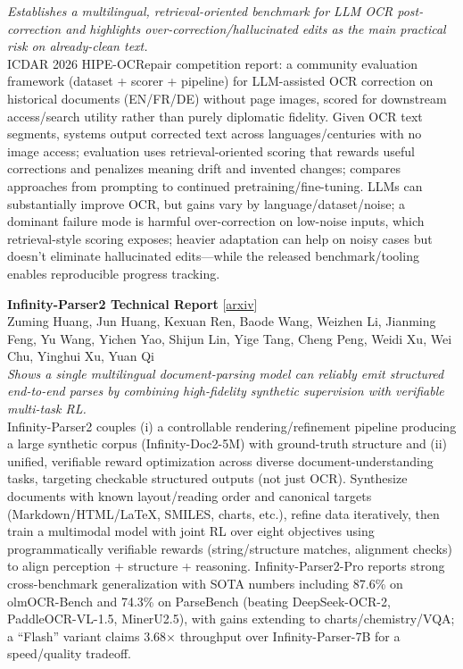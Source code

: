 \documentclass[12pt,letterpaper]{article}
\begin{document}
{\small\textit{Establishes a multilingual, retrieval-oriented benchmark for LLM OCR post-correction and highlights over-correction/hallucinated edits as the main practical risk on already-clean text.}}\\[1pt]
{\footnotesize ICDAR 2026 HIPE-OCRepair competition report: a community evaluation framework (dataset + scorer + pipeline) for LLM-assisted OCR correction on historical documents (EN/FR/DE) without page images, scored for downstream access/search utility rather than purely diplomatic fidelity. Given OCR text segments, systems output corrected text across languages/centuries with no image access; evaluation uses retrieval-oriented scoring that rewards useful corrections and penalizes meaning drift and invented changes; compares approaches from prompting to continued pretraining/fine-tuning. LLMs can substantially improve OCR, but gains vary by language/dataset/noise; a dominant failure mode is harmful over-correction on low-noise inputs, which retrieval-style scoring exposes; heavier adaptation can help on noisy cases but doesn't eliminate hallucinated edits---while the released benchmark/tooling enables reproducible progress tracking.}

\medskip

{\small\textbf{Infinity-Parser2 Technical Report}} {\scriptsize[\href{https://arxiv.org/abs/2607.07836}{arxiv}]}\\
{\scriptsize Zuming Huang, Jun Huang, Kexuan Ren, Baode Wang, Weizhen Li, Jianming Feng, Yu Wang, Yichen Yao, Shijun Lin, Yige Tang, Cheng Peng, Weidi Xu, Wei Chu, Yinghui Xu, Yuan Qi}\\

{\small\textit{Shows a single multilingual document-parsing model can reliably emit structured end-to-end parses by combining high-fidelity synthetic supervision with verifiable multi-task RL.}}\\[1pt]
{\footnotesize Infinity-Parser2 couples (i) a controllable rendering/refinement pipeline producing a large synthetic corpus (Infinity-Doc2-5M) with ground-truth structure and (ii) unified, verifiable reward optimization across diverse document-understanding tasks, targeting checkable structured outputs (not just OCR). Synthesize documents with known layout/reading order and canonical targets (Markdown/HTML/LaTeX, SMILES, charts, etc.), refine data iteratively, then train a multimodal model with joint RL over eight objectives using programmatically verifiable rewards (string/structure matches, alignment checks) to align perception + structure + reasoning. Infinity-Parser2-Pro reports strong cross-benchmark generalization with SOTA numbers including 87.6\% on olmOCR-Bench and 74.3\% on ParseBench (beating DeepSeek-OCR-2, PaddleOCR-VL-1.5, MinerU2.5), with gains extending to charts/chemistry/VQA; a ``Flash'' variant claims 3.68× throughput over Infinity-Parser-7B for a speed/quality tradeoff.}
\end{document}
